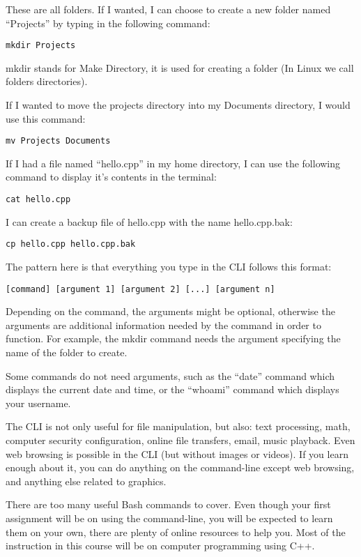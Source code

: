 \documentclass[a4paper,12pt]{article}
\begin{document}
These are all folders. If I wanted, I can choose to create a new folder named ``Projects'' by typing in the following command:
\begin{lstlisting}
mkdir Projects
\end{lstlisting}
mkdir stands for Make Directory, it is used for creating a folder (In Linux we call folders directories).

If I wanted to move the projects directory into my Documents directory, I would use this command:
\begin{lstlisting}
mv Projects Documents
\end{lstlisting}

If I had a file named ``hello.cpp'' in my home directory, I can use the following command to display it's contents in the terminal:
\begin{lstlisting}
cat hello.cpp
\end{lstlisting}

I can create a backup file of hello.cpp with the name hello.cpp.bak:
\begin{lstlisting}
cp hello.cpp hello.cpp.bak
\end{lstlisting}

The pattern here is that everything you type in the CLI follows this format:
\begin{lstlisting}
[command] [argument 1] [argument 2] [...] [argument n]
\end{lstlisting}

Depending on the command, the arguments might be optional, otherwise the arguments are additional information needed by the command in order to function. For example, the mkdir command needs the argument specifying the name of the folder to create.

Some commands do not need arguments, such as the ``date'' command which displays the current date and time, or the ``whoami'' command which displays your username.

The CLI is not only useful for file manipulation, but also: text processing, math, computer security configuration, online file transfers, email, music playback. Even web browsing is possible in the CLI (but without images or videos). If you learn enough about it, you can do anything on the command-line except web browsing, and anything else related to graphics.

There are too many useful Bash commands to cover. Even though your first assignment will be on using the command-line, you will be expected to learn them on your own, there are plenty of online resources to help you. Most of the instruction in this course will be on computer programming using C++.
\end{document}
